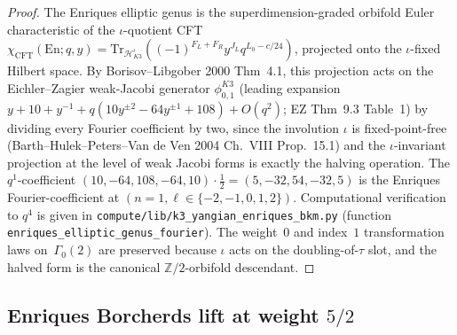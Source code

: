 \begin{proof}[Proof]
The Enriques elliptic genus is the superdimension-graded
orbifold Euler characteristic of the $\iota$-quotient CFT
$\chi_{\mathrm{CFT}}(\mathrm{En}; q, y) = \mathrm{Tr}_{\mathcal{H}_{K3}^\iota}
((-1)^{F_L + F_R} y^{J_L} q^{L_0 - c/24})$, projected onto the
$\iota$-fixed Hilbert space. By Borisov--Libgober 2000 Thm~4.1,
this projection acts on the Eichler--Zagier weak-Jacobi
generator $\phi_{0,1}^{K3}$ (leading expansion $y + 10 + y^{-1}
+ q(10y^{\pm 2} - 64 y^{\pm 1} + 108) + O(q^2)$; EZ Thm~9.3 Table~1)
by dividing every Fourier coefficient by two, since the involution
$\iota$ is fixed-point-free (Barth--Hulek--Peters--Van de Ven 2004
Ch.~VIII Prop.~15.1) and the $\iota$-invariant projection at the
level of weak Jacobi forms is exactly the halving operation. The
$q^1$-coefficient $(10, -64, 108, -64, 10)\cdot\tfrac{1}{2}
= (5, -32, 54, -32, 5)$ is the Enriques Fourier-coefficient at
$(n = 1, \ell\in\{-2, -1, 0, 1, 2\})$. Computational verification
to $q^4$ is given in
\texttt{compute/lib/k3\_yangian\_enriques\_bkm.py}
(function \texttt{enriques\_elliptic\_genus\_fourier}). The
weight~$0$ and index~$1$ transformation laws on~$\Gamma_0(2)$ are
preserved because $\iota$ acts on the doubling-of-$\tau$ slot,
and the halved form is the canonical $\mathbb{Z}/2$-orbifold
descendant.
\end{proof}

\subsection{Enriques Borcherds lift at weight \texorpdfstring{$5/2$}{5/2}}
\label{subsec:bkm-enriques-borcherds-lift}

